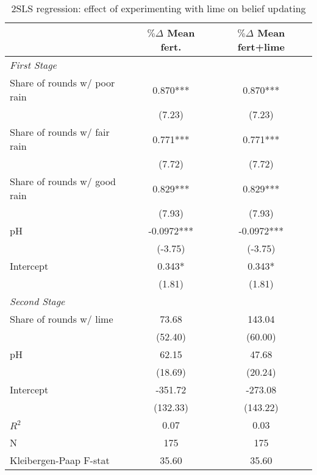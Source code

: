 \begin{table}[htbp]
\centering
\hspace*{-1.2cm}
\begin{threeparttable}
\caption{2SLS regression: effect of experimenting with lime on belief updating}
\label{tab:ivBeliefs}
\begin{tabular}{l cc}
\hline
\hline
                    &\multicolumn{1}{c}{$\%\Delta$  Mean fert.}&\multicolumn{1}{c}{$\%\Delta$ Mean fert+lime}\\
\hline
\textit{First Stage}&               &               \\
Share of rounds w/ poor rain&       0.870***&       0.870***\\
                    &      (7.23)   &      (7.23)   \\
Share of rounds w/ fair rain&       0.771***&       0.771***\\
                    &      (7.72)   &      (7.72)   \\
Share of rounds w/ good rain&       0.829***&       0.829***\\
                    &      (7.93)   &      (7.93)   \\
pH                  &     -0.0972***&     -0.0972***\\
                    &     (-3.75)   &     (-3.75)   \\
Intercept           &       0.343*  &       0.343*  \\
                    &      (1.81)   &      (1.81)   \\
\hline
%
%
\textit{Second Stage}&                     &                     \\
Share of rounds w/ lime&       73.68         &      143.04\sym{*}  \\
            &     (52.40)         &     (60.00)         \\
pH          &       62.15\sym{***}&       47.68\sym{*}  \\
            &     (18.69)         &     (20.24)         \\
Intercept   &     -351.72\sym{**} &     -273.08         \\
            &    (132.33)         &    (143.22)         \\
\hline
$R^2$       &        0.07         &        0.03         \\
N           &         175         &         175         \\
Kleibergen-Paap F-stat&       35.60         &       35.60         \\

\end{tabular}
\end{threeparttable}
\end{table}
